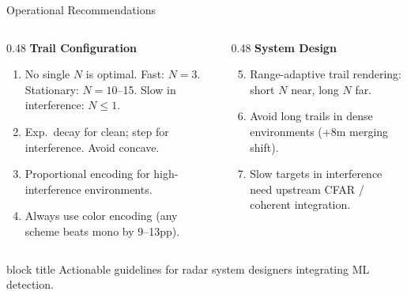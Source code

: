 \documentclass[aspectratio=169, 10pt]{beamer}
\newcommand{\keypoint}[1]{%
  \vfill
  \begin{beamercolorbox}[wd=\textwidth, dp=0.4em, leftskip=0.3cm]{block title}%
    \small #1%
  \end{beamercolorbox}%
}
\begin{document}
\begin{frame}{Operational Recommendations}

\begin{columns}[T]
\begin{column}{0.48\textwidth}
  \textcolor{Garnet}{\textbf{Trail Configuration}}
  \begin{enumerate}
    \item No single $N$ is optimal. Fast: $N{=}3$. Stationary: $N{=}10$--15. Slow in interference: $N{\leq}1$.
    \item Exp.\ decay for clean; step for interference. Avoid concave.
    \item Proportional encoding for high-interference environments.
    \item Always use color encoding (any scheme beats mono by 9--13pp).
  \end{enumerate}
\end{column}
\begin{column}{0.48\textwidth}
  \textcolor{Atlantic}{\textbf{System Design}}
  \begin{enumerate}
    \setcounter{enumi}{4}
    \item Range-adaptive trail rendering: short $N$ near, long $N$ far.
    \item Avoid long trails in dense environments (+8m merging shift).
    \item Slow targets in interference need upstream CFAR / coherent integration.
  \end{enumerate}
\end{column}
\end{columns}

\keypoint{Actionable guidelines for radar system designers integrating ML detection.}
\end{frame}
\end{document}
